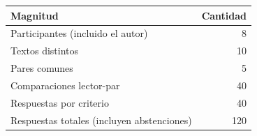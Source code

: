 \begin{tabular}{@{}lr@{}}
\toprule
Magnitud & Cantidad \\
\midrule
Participantes (incluido el autor) & 8 \\
Textos distintos & 10 \\
Pares comunes & 5 \\
Comparaciones lector-par & 40 \\
Respuestas por criterio & 40 \\
Respuestas totales (incluyen abstenciones) & 120 \\
\bottomrule
\end{tabular}
